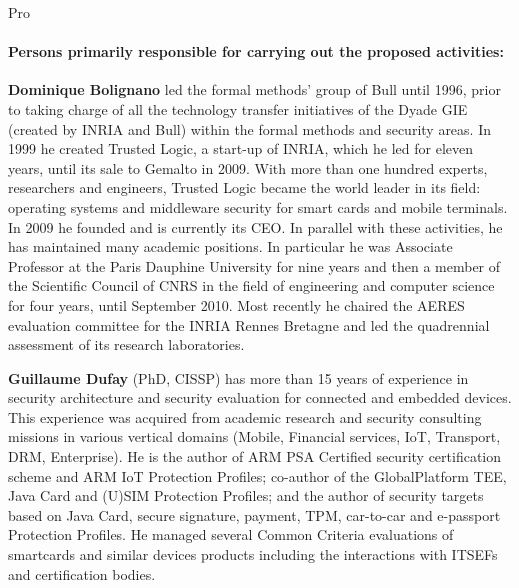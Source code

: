 \begin{sitedescription}{Pro}

\paragraph*{Persons primarily responsible for carrying out the proposed activities:}

\begin{compactitem} %

\item {\bf Dominique Bolignano} led the formal methods'
  group of Bull until 1996, prior to taking charge of all the
  technology transfer initiatives of the Dyade GIE (created by INRIA
  and Bull) within the formal methods and security areas. In 1999 he
  created Trusted Logic, a start-up of INRIA, which he led for eleven
  years, until its sale to Gemalto in 2009. With more than one hundred
  experts, researchers and engineers, Trusted Logic became the world
  leader in its field: operating systems and middleware security for
  smart cards and mobile terminals. In 2009 he founded \provenrun{} and
  is currently its CEO. In parallel with these activities, he has
  maintained many academic positions. In particular he was Associate
  Professor at the Paris Dauphine University for nine years and then a
  member of the Scientific Council of CNRS in the field of engineering
  and computer science for four years, until September 2010. Most
  recently he chaired the AERES evaluation committee for the INRIA
  Rennes Bretagne and led the quadrennial assessment of its research
  laboratories.

\item {\bf Guillaume Dufay} (PhD, CISSP) has more than 15 years of
  experience in security architecture and security evaluation for
  connected and embedded devices. This experience was acquired from
  academic research and security consulting missions in various
  vertical domains (Mobile, Financial services, IoT, Transport, DRM,
  Enterprise). He is the author of ARM PSA Certified security
  certification scheme and ARM IoT Protection Profiles; co-author of
  the GlobalPlatform TEE, Java Card and (U)SIM Protection Profiles;
  and the author of security targets based on Java Card, secure
  signature, payment, TPM, car-to-car and e-passport Protection
  Profiles. He managed several Common Criteria evaluations of
  smartcards and similar devices products including the interactions
  with ITSEFs and certification bodies.


\end{compactitem}
\end{sitedescription}
